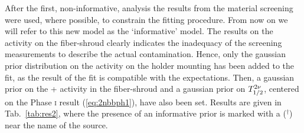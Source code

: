  After the first, non-informative, analysis the results from the material screening were used, where possible, to constrain the fitting procedure. From now on we will refer to this new model as the `informative' model. The results on the  activity on the fiber-shroud clearly indicates the inadequacy of the screening measurements to describe the actual contamination. Hence, only the gaussian prior distribution on the  activity on the holder mounting has been added to the fit, as the result of the fit is compatible with the expectations. Then, a gaussian prior on the  +  activity in the fiber-shroud and a gaussian prior on $T_{1/2}^{2\nu}$, centered on the {\gerda} Phase \textsc{i} result (\ref{eq:2nbbph1}), have also been set. Results are given in Tab.~\ref{tab:res2}, where the presence of an informative prior is marked with a ($^{\dagger}$) near the name of the source.

